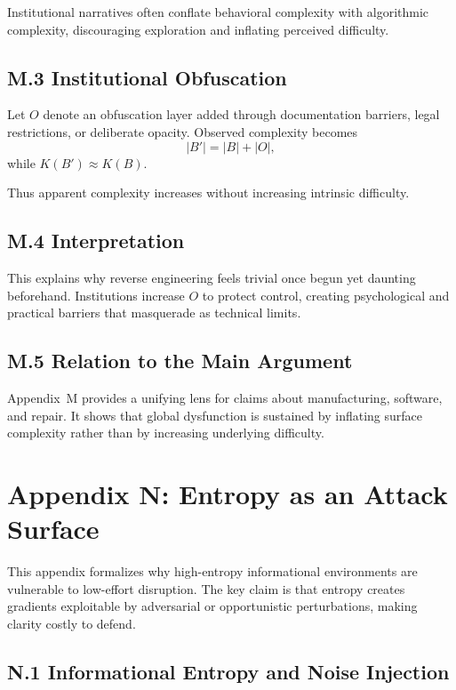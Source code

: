\documentclass[11pt]{article}
\begin{document}
Institutional narratives often conflate behavioral complexity with algorithmic complexity, discouraging exploration and inflating perceived difficulty.

\subsection{M.3 Institutional Obfuscation}

Let \(O\) denote an obfuscation layer added through documentation barriers, legal restrictions, or deliberate opacity. Observed complexity becomes
\[
|B'| = |B| + |O|,
\]
while \(K(B') \approx K(B)\).

Thus apparent complexity increases without increasing intrinsic difficulty.

\subsection{M.4 Interpretation}

This explains why reverse engineering feels trivial once begun yet daunting beforehand. Institutions increase \(O\) to protect control, creating psychological and practical barriers that masquerade as technical limits.

\subsection{M.5 Relation to the Main Argument}

Appendix~M provides a unifying lens for claims about manufacturing, software, and repair. It shows that global dysfunction is sustained by inflating surface complexity rather than by increasing underlying difficulty.

\section{Appendix N: Entropy as an Attack Surface}
\label{app:attack-detailed}

This appendix formalizes why high-entropy informational environments are vulnerable to low-effort disruption. The key claim is that entropy creates gradients exploitable by adversarial or opportunistic perturbations, making clarity costly to defend.

\subsection{N.1 Informational Entropy and Noise Injection}
\end{document}
